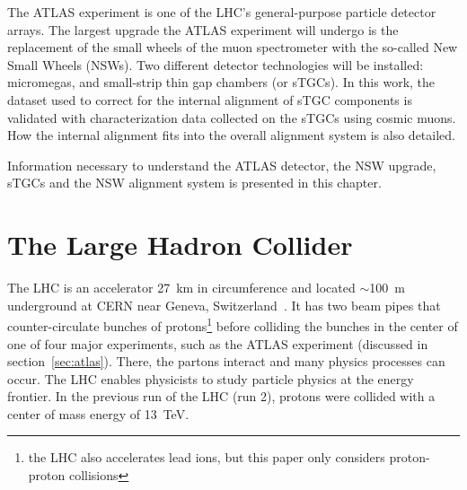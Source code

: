 The ATLAS experiment is one of the LHC's general-purpose particle detector arrays. The largest upgrade the ATLAS experiment will undergo is the replacement of the small wheels of the muon spectrometer with the so-called New Small Wheels (NSWs). Two different detector technologies will be installed: micromegas, and small-strip thin gap chambers (or sTGCs). In this work, the dataset used to correct for the internal alignment of sTGC components is validated with characterization data collected on the sTGCs using cosmic muons. How the internal alignment fits into the overall alignment system is also detailed. 

Information necessary to understand the ATLAS detector, the NSW upgrade, sTGCs and the NSW alignment system is presented in this chapter. 

\section{The Large Hadron Collider}

The LHC is an accelerator \SI{27}{\kilo\meter} in circumference and located $\sim$\SI{100}{\meter} underground at CERN near Geneva, Switzerland~\cite{evans_lhc_2008}. It has two beam pipes that counter-circulate bunches of protons\footnote{the LHC also accelerates lead ions, but this paper only considers proton-proton collisions} before colliding the bunches in the center of one of four major experiments, such as the ATLAS experiment (discussed in section~\ref{sec:atlas}). There, the partons interact and many physics processes can occur. The LHC enables physicists to study particle physics at the energy frontier. In the previous run of the LHC (run 2), protons were collided with a center of mass energy of \SI{13}{\tera\electronvolt}. 



